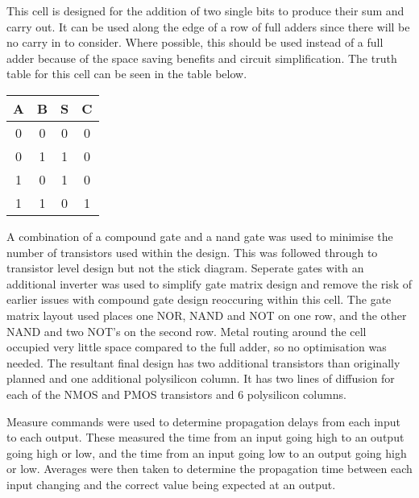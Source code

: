
This cell is designed for the addition of two single bits to produce their sum and carry out. 
It can be used along the edge of a row of full adders since there will be no carry in to consider. Where possible, this should be used instead of a full adder because of the space saving benefits and circuit simplification. 
The truth table for this cell can be seen in the table below.

\begin{tabular}{| c | c || c | c |}
\hline
A & B &  S & C \\ \hline
0 & 0 &  0 & 0 \\
0 & 1 &  1 & 0 \\
1 & 0 &  1 & 0 \\
1 & 1 &  0 & 1 \\ \hline
\end{tabular}

A combination of a compound gate and a nand gate was used to minimise the number of transistors used within the design.
This was followed through to transistor level design but not the stick diagram. Seperate gates with an additional inverter was used to simplify gate matrix design and remove the risk of earlier issues with compound gate design reoccuring within this cell.
The gate matrix layout used places one NOR, NAND and NOT on one row, and the other NAND and two NOT's on the second row. Metal routing around the cell occupied very little space compared to the full adder, so no optimisation was needed.
The resultant final design has two additional transistors than originally planned and one additional polysilicon column. 
It has two lines of diffusion for each of the NMOS and PMOS transistors and 6 polysilicon columns. 


Measure commands were used to determine propagation delays from each input to each output. These measured the time from an input going high to an output going high or low, and the time from an input going low to an output going high or low. 
Averages were then taken to determine the propagation time between each input changing and the correct value being expected at an output. 